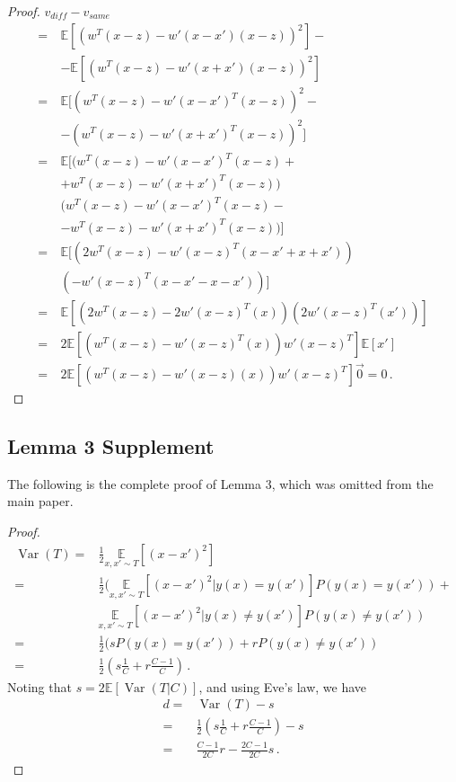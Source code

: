 \documentclass[runningheads]{llncs}
\DeclareMathOperator{\Var}{Var}
\begin{document}
\begin{proof} $v_{\mathit{diff}} - v_{same}$
\begin{align*}
=\,& \mathbb{E}[(w^T(x-z) - w'(x-x')(x-z))^2] - \\
    &-\mathbb{E}[(w^T(x-z) - w'(x+x')(x-z))^2] \\
    =\ & \mathbb{E}[(w^T(x-z) - w'(x-x')^T(x-z))^2 - \\
    &-(w^T(x-z) - w'(x+x')^T(x-z))^2] \\
    =\ & \mathbb{E}[(w^T(x-z) - w'(x-x')^T(x-z) + \\
    &+w^T(x-z) - w'(x+x')^T(x-z)) \\
        &(w^T(x-z) - w'(x-x')^T(x-z) - \\
        &-w^T(x-z) - w'(x+x')^T(x-z))] \\
    =\ & \mathbb{E}[(2w^T(x-z) - w'(x-z)^T(x-x'+x+x'))\\
    &(- w'(x-z)^T(x-x'-x-x'))] \\
    =\ & \mathbb{E}[(2w^T(x-z) - 2w'(x-z)^T(x))(2w'(x-z)^T(x'))] \\
    =\ & 2\mathbb{E}[(w^T(x-z) - w'(x-z)^T(x))w'(x-z)^T]\mathbb{E}[x'] \\
    =\ & 2\mathbb{E}[(w^T(x-z) - w'(x-z)(x))w'(x-z)^T]\vec{0} = 0\,.
\end{align*}
\end{proof}

\subsection{Lemma 3 Supplement}
The following is the complete proof of Lemma 3, which was omitted from the main paper.

\begin{proof}
\begin{align*}
    \Var(T) =& \tfrac{1}{2}\underset{x, x' \sim T}{\mathbb{E}}[(x-x')^2] \\
    =& \tfrac{1}{2}(\underset{x, x' \sim T}{\mathbb{E}}[(x-x')^2|y(x) = y(x')]P(y(x) = y(x')) + \\ &\underset{x, x' \sim T}{\mathbb{E}}[(x-x')^2|y(x) \neq y(x')]P(y(x) \neq y(x'))\\
    =& \tfrac{1}{2}(sP(y(x) = y(x')) +  rP(y(x) \neq y(x'))\\
    =& \frac{1}{2}\left(s\frac{1}{C} +  r\frac{C-1}{C}\right)\,.
\end{align*}
Noting that $s = 2\mathbb{E}[\Var(T|C)]$, and using Eve's law, we have
\begin{align*}
    d =& \Var(T) -s \\
    =& \frac{1}{2}\left(s\frac{1}{C} +  r\frac{C-1}{C}\right) -s \\
    =& \frac{C-1}{2C}r - \frac{2C -1}{2C}s\,.
\end{align*}
\end{proof}
\end{document}
